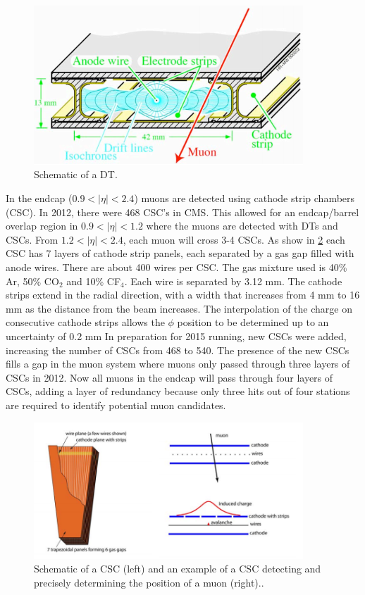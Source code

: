 \documentclass[oneside, letterpaper, oldfontcommands]{memoir}
\begin{document}
\begin{figure}[here]
\includegraphics[width=0.9\textwidth]{drift_tube.png}
\caption{Schematic of a DT\cite{1748-0221-3-08-S08001}.}
\label{fig:drift_tube}
\end{figure}

\qquad In the endcap ($ 0.9 < |\eta| < 2.4$) muons are detected using cathode strip chambers (CSC). In 2012, there were 468 CSC's in CMS. This allowed for an endcap/barrel overlap region in $0.9 < |\eta| < 1.2$ where the muons are detected with DTs and CSCs. From $1.2 < |\eta| < 2.4$, each muon will cross 3-4 CSCs. As show in \ref{fig:muoncsc} each CSC has 7 layers of cathode strip panels, each separated by a gas gap filled with anode wires. There are about 400 wires per CSC. The gas mixture used is 40\% Ar, 50\% CO$_{2}$ and 10\% CF$_{4}$. Each wire is separated by 3.12 mm. The cathode strips extend in the radial direction, with a width that increases from 4 mm to 16 mm as the distance from the beam increases. The interpolation of the charge on consecutive cathode strips allows the $\phi$ position to be determined up to an uncertainty of 0.2 mm\cite{Collaboration:1355706} In preparation for 2015 running, new CSCs were added, increasing the number of CSCs from 468 to 540. The presence of the new CSCs fills a gap in the muon system where muons only passed through three layers of CSCs in 2012. Now all muons in the endcap will pass through four layers of CSCs, adding a layer of redundancy because only three hits out of four stations are required to identify potential muon candidates.

\begin{figure}[here]
\includegraphics[width=0.9\textwidth]{muoncsc.png}
\caption{Schematic of a CSC (left) and an example of a CSC detecting and precisely determining the position of a muon (right).\cite{1748-0221-3-08-S08001}.}
\label{fig:muoncsc}
\end{figure}
\end{document}
